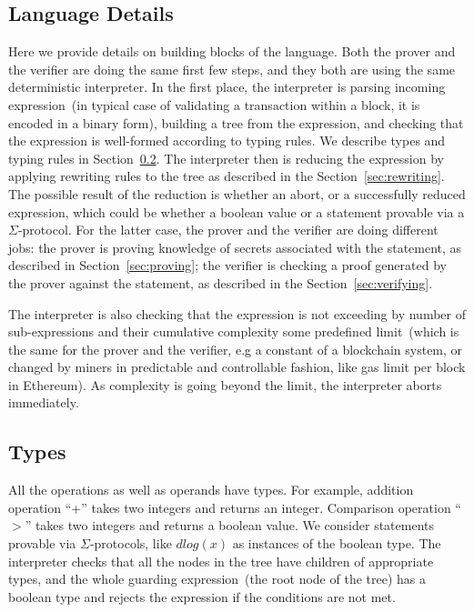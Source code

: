 \documentclass[]{llncs}
\begin{document}
\subsection{Language Details} 
\label{sec:lang-details}

Here we provide details on building blocks of the language.  
Both the prover and the verifier are doing the same first few steps, and they both are using the same deterministic interpreter. In the first place, the interpreter is parsing incoming expression~(in typical case of validating a transaction within a block, it is encoded in a binary form), building a tree from the expression, and checking that the expression is well-formed according to typing rules. We describe types and typing rules in Section~\ref{sec:types}. The interpreter then is reducing the expression by applying rewriting rules to the tree as described in the Section~\ref{sec:rewriting}. The possible result of the reduction is whether an abort, or a successfully reduced expression, which could be whether a boolean value or a statement provable via a $\Sigma$-protocol. For the latter case, the prover and the verifier are doing different jobs: the prover is proving knowledge of secrets associated with the statement, as described in Section~\ref{sec:proving}; the verifier is checking a proof generated by the prover against the statement, as described in the Section~\ref{sec:verifying}.   

The interpreter is also checking that the expression is not exceeding by number of sub-expressions and their cumulative complexity some predefined limit~(which is the same for the prover and the verifier, e.g a constant of a blockchain system, or changed by miners in predictable and controllable fashion, like gas limit per block in Ethereum). As complexity is going beyond the limit, the interpreter aborts immediately. 


\subsection{Types}
\label{sec:types}

All the operations as well as operands have types. For example, addition operation ``+'' takes two integers and returns an integer. Comparison operation ``$>$'' takes two integers and returns a boolean value. We consider statements provable via $\Sigma$-protocols, like $dlog(x)$ as instances of the boolean type. The interpreter checks that all the nodes in the tree have children of appropriate types, and the whole guarding expression~(the root node of the tree) has a boolean type and rejects the expression if the conditions are not met. 
\end{document}
